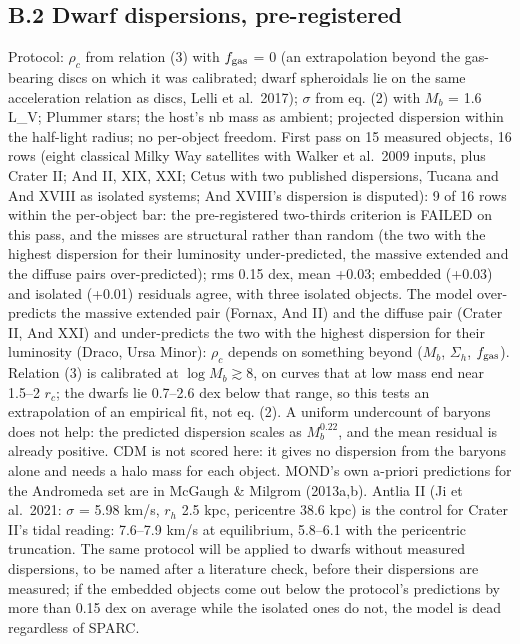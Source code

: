 \documentclass[
  10pt,
]{article}
\begin{document}
\subsection{B.2 Dwarf dispersions, pre-registered}

Protocol: $\rho_c$ from relation
(3) with $f_{\rm gas}$ = 0 (an extrapolation beyond the gas-bearing discs on which it was calibrated; dwarf spheroidals lie on the same acceleration relation as discs, Lelli et al.~2017); $\sigma$ from eq. (2) with $M_b$ = 1.6 L\_V; Plummer
stars; the host's nb mass as ambient; projected dispersion within the
half-light radius; no per-object freedom. First pass on 15 measured
objects, 16 rows (eight classical Milky Way satellites with Walker et
al.~2009 inputs, plus Crater II; And II, XIX, XXI; Cetus with two
published dispersions, Tucana and And XVIII as isolated systems; And
XVIII's dispersion is disputed): 9 of 16 rows within the per-object bar: the pre-registered two-thirds criterion is FAILED on this pass, and the misses are structural rather than random (the two with the highest dispersion for their luminosity under-predicted, the massive extended and the diffuse pairs over-predicted); rms 0.15 dex, mean +0.03;
embedded (+0.03) and isolated (+0.01) residuals agree, with three
isolated objects. The model over-predicts the massive extended pair
(Fornax, And II) and the diffuse pair (Crater II, And XXI) and
under-predicts the two with the highest dispersion for their luminosity (Draco, Ursa Minor): $\rho_c$ depends on
something beyond ($M_b$, $\Sigma_h$, $f_{\rm gas}$). Relation (3) is calibrated at $\log M_b \gtrsim 8$, on curves that at low mass end near 1.5--2 $r_c$; the dwarfs lie 0.7--2.6 dex below that range, so this tests an extrapolation of an empirical fit, not eq. (2). A uniform undercount of baryons does not help: the predicted dispersion scales as $M_b^{0.22}$, and the mean residual is already positive. CDM is not scored here: it gives no dispersion from the baryons alone and needs a halo mass for each object. MOND's own a-priori
predictions for the Andromeda set are in McGaugh \& Milgrom (2013a,b).
Antlia II (Ji et al.~2021: $\sigma$ = 5.98 km/s, $r_h$ 2.5 kpc, pericentre
38.6 kpc) is the control for Crater II's tidal reading: 7.6--7.9 km/s at
equilibrium, 5.8--6.1 with the pericentric truncation. The
same protocol will be applied to dwarfs without measured dispersions, to
be named after a literature check, before their dispersions are
measured; if the embedded objects come out below the protocol's
predictions by more than 0.15 dex on average while the isolated ones do
not, the model is dead regardless of SPARC.
\end{document}
